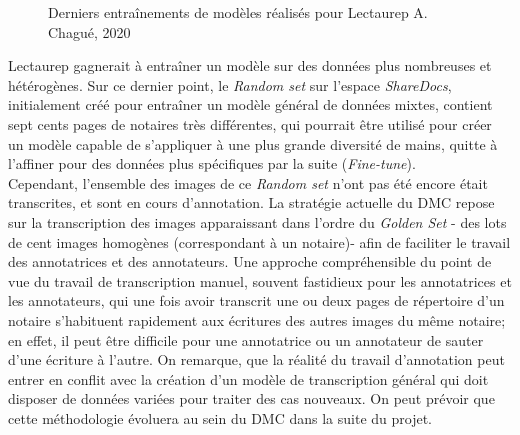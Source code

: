 \begin{figure}[H]
    \centering
    \centerline{}
    \caption{Derniers entraînements de modèles réalisés pour Lectaurep   \textcopyright A. Chagué, 2020}
    \label{fig:visual_newmodels}
\end{figure}

Lectaurep gagnerait à entraîner un modèle sur des données plus nombreuses et hétérogènes. Sur ce dernier point, le \textit{Random set} sur l'espace \textit{ShareDocs}, initialement créé pour entraîner un modèle général de données mixtes, contient sept cents pages de notaires très différentes, qui pourrait être utilisé pour créer un modèle capable de s'appliquer à une plus grande diversité de mains, quitte à l'affiner pour des données plus spécifiques par la suite (\textit{Fine-tune}).\\

Cependant, l'ensemble des images de ce \textit{Random set} n'ont pas été encore était transcrites, et sont en cours d'annotation. La stratégie actuelle du DMC repose sur la transcription des images apparaissant dans l'ordre du \textit{Golden Set} - des lots de cent images homogènes (correspondant à un notaire)- afin de faciliter le travail des annotatrices et des annotateurs. Une approche compréhensible du point de vue du travail de transcription manuel, souvent fastidieux pour les annotatrices et les annotateurs, qui une fois avoir transcrit une ou deux pages de répertoire d'un notaire s'habituent rapidement aux écritures des autres images du même notaire; en effet, il peut être difficile pour une annotatrice ou un annotateur de sauter d'une écriture à l'autre. On remarque, que la réalité du travail d'annotation peut entrer en conflit avec la création d'un modèle de transcription général qui doit disposer de données variées pour traiter des cas nouveaux. On peut prévoir que cette méthodologie évoluera au sein du DMC dans la suite du projet.



